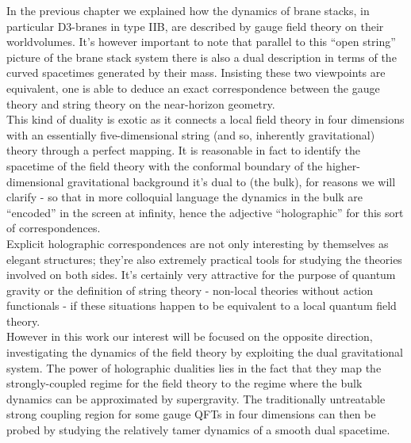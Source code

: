
In the previous chapter we explained how the dynamics of brane stacks, in particular D3-branes in type IIB, are described by gauge field theory on their worldvolumes. It's however important to note that parallel to this ``open string'' picture of the brane stack system there is also a dual description in terms of the curved spacetimes generated by their mass. Insisting these two viewpoints are equivalent, one is able to deduce an exact correspondence between the gauge theory and string theory on the near-horizon geometry.\\

This kind of duality is exotic as it connects a local field theory in four dimensions with an essentially five-dimensional string (and so, inherently gravitational) theory through a perfect mapping. It is reasonable in fact to identify the spacetime of the field theory with the conformal boundary of the higher-dimensional gravitational background it's dual to (the bulk), for reasons we will clarify - so that in more colloquial language the dynamics in the bulk are ``encoded'' in the screen at infinity, hence the adjective ``holographic'' for this sort of correspondences.\\

Explicit holographic correspondences are not only interesting by themselves as elegant structures; they're also extremely practical tools for studying the theories involved on both sides. It's certainly very attractive for the purpose of quantum gravity or the definition of string theory - non-local theories without action functionals - if these situations happen to be equivalent to a local quantum field theory.\\


However in this work our interest will be focused on the opposite direction, investigating the dynamics of the field theory by exploiting the dual gravitational system. The power of holographic dualities lies in the fact that they map the strongly-coupled regime for the field theory to the regime where the bulk dynamics can be approximated by supergravity. The traditionally untreatable strong coupling region for some gauge QFTs in four dimensions can then be probed by studying the relatively tamer dynamics of a smooth dual spacetime.



